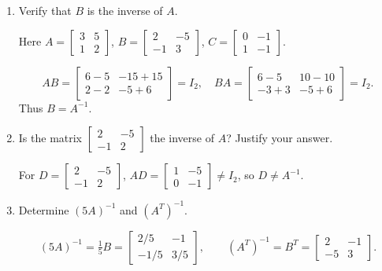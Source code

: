 \begin{enumerate}[label=\alph*)]

\item Verify that $B$ is the inverse of $A$.

\begin{answer}
Here $A=\begin{bmatrix}3&5\\1&2\end{bmatrix}$,
$B=\begin{bmatrix}2&-5\\-1&3\end{bmatrix}$,
$C=\begin{bmatrix}0&-1\\1&-1\end{bmatrix}$.

\[
 AB=\begin{bmatrix}6-5&-15+15\\2-2&-5+6\end{bmatrix}=I_2,
 \quad BA=\begin{bmatrix}6-5&10-10\\-3+3&-5+6\end{bmatrix}=I_2.
\]
Thus $B=A^{-1}$.
\end{answer}

\item Is the matrix $\begin{bmatrix}2&-5\\-1&2\end{bmatrix}$ the inverse of $A$? Justify your answer.

\begin{answer}
For $D=\begin{bmatrix}2&-5\\-1&2\end{bmatrix}$,
$AD=\begin{bmatrix}1&-5\\0&-1\end{bmatrix}\ne I_2$, so $D\ne A^{-1}$.
\end{answer}

\item Determine $(5A)^{-1}$ and $(A^T)^{-1}$.

\begin{answer}
\[
 (5A)^{-1}=\tfrac15B=\begin{bmatrix}2/5&-1\\-1/5&3/5\end{bmatrix},\qquad
 (A^T)^{-1}=B^T=\begin{bmatrix}2&-1\\-5&3\end{bmatrix}.
\]
\end{answer}


\end{enumerate}
